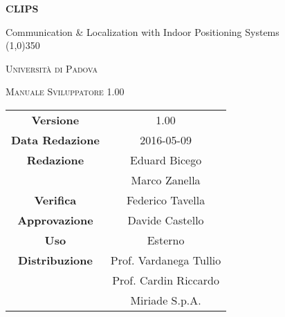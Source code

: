\documentclass[a4paper,12pt]{article}
\author{Eduard Bicego}
\date{08/05/2016}
\begin{document}
\begin{titlepage}
	\centering
	{\huge\bfseries CLIPS\par}
	Communication \& Localization with Indoor Positioning Systems \\
	\line(1,0){350} \\
	{\scshape\LARGE Università di Padova \par}
	\vspace{1cm}
	{\scshape\Large Manuale Sviluppatore 1.00 \par}
	\logo
	\newpage
	\begin{tabular}{c|c}
		{\hfill \textbf{Versione}} 			& 1.00						\\
		{\hfill\textbf{Data Redazione}} 	& 2016-05-09  				\\
		{\hfill\textbf{Redazione}} 			& Eduard Bicego				\\
											& Marco Zanella				\\
		{\hfill\textbf{Verifica}} 			& Federico Tavella			\\
		{\hfill\textbf{Approvazione}} 		& Davide Castello			\\
		{\hfill\textbf{Uso}} 				& Esterno					\\
		{\hfill\textbf{Distribuzione}} 		& Prof. Vardanega Tullio	\\
											& Prof. Cardin Riccardo 	\\
											& Miriade S.p.A. 			\\
	\end{tabular}
\end{titlepage}
	
	\newpage
	\pagestyle{myfront}
	
		\newpage
			
		\newpage
			\tableofcontents
		\newpage
			\listoffigures
	\label{LastFrontPage}

	\newpage
		\pagestyle{mymain}
	\newpage
		
	\newpage
		
	\newpage
		
	\newpage
		
	\newpage
		
	\newpage
		
	\newpage
		
	\newpage
		
		
	\newpage
		

	\newpage
		\printglossary

		
	\label{LastPage}
\end{document}
